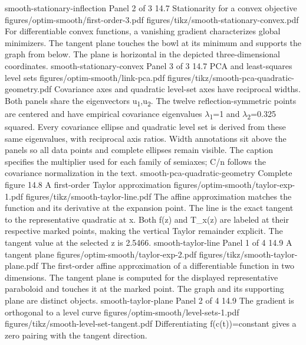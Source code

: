 {smooth-stationary-inflection}
{Panel 2 of 3}
{14.7}
{Stationarity for a convex objective}
{figures/optim-smooth/first-order-3.pdf}
{figures/tikz/smooth-stationary-convex.pdf}
{For differentiable convex functions, a vanishing gradient characterizes global minimizers.}
{The tangent plane touches the bowl at its minimum and supports the graph from below. The plane is horizontal in the depicted three-dimensional coordinates.}
{smooth-stationary-convex}
{Panel 3 of 3}
{14.7}
{PCA and least-squares level sets}
{figures/optim-smooth/link-pca.pdf}
{figures/tikz/smooth-pca-quadratic-geometry.pdf}
{Covariance axes and quadratic level-set axes have reciprocal widths.}
{Both panels share the eigenvectors u\textsubscript{1},u\textsubscript{2}. The twelve reflection-symmetric points are centered and have empirical covariance eigenvalues \ensuremath{\lambda}\textsubscript{1}=1 and \ensuremath{\lambda}\textsubscript{2}=0.325 squared. Every covariance ellipse and quadratic level set is derived from these same eigenvalues, with reciprocal axis ratios. Width annotations sit above the panels so all data points and complete ellipses remain visible. The caption specifies the multiplier used for each family of semiaxes; C/n follows the covariance normalization in the text.}
{smooth-pca-quadratic-geometry}
{Complete figure}
{14.8}
{A first-order Taylor approximation}
{figures/optim-smooth/taylor-exp-1.pdf}
{figures/tikz/smooth-taylor-line.pdf}
{The affine approximation matches the function and its derivative at the expansion point.}
{The line is the exact tangent to the representative quadratic at x. Both f(z) and T\_x(z) are labeled at their respective marked points, making the vertical Taylor remainder explicit. The tangent value at the selected z is 2.5466.}
{smooth-taylor-line}
{Panel 1 of 4}
{14.9}
{A tangent plane}
{figures/optim-smooth/taylor-exp-2.pdf}
{figures/tikz/smooth-taylor-plane.pdf}
{The first-order affine approximation of a differentiable function in two dimensions.}
{The tangent plane is computed for the displayed representative paraboloid and touches it at the marked point. The graph and its supporting plane are distinct objects.}
{smooth-taylor-plane}
{Panel 2 of 4}
{14.9}
{The gradient is orthogonal to a level curve}
{figures/optim-smooth/level-sets-1.pdf}
{figures/tikz/smooth-level-set-tangent.pdf}
{Differentiating f(c(t))=constant gives a zero pairing with the tangent direction.}
